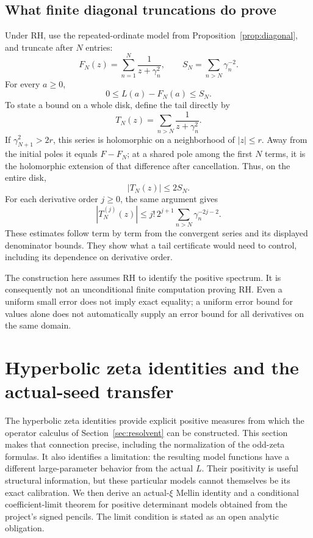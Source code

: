 \documentclass[11pt,a4paper]{article}
\numberwithin{equation}{section}
\theoremstyle{definition}
\theoremstyle{remark}
\begin{document}
\subsection{What finite diagonal truncations do prove}

Under RH, use the repeated-ordinate model from
Proposition~\ref{prop:diagonal}, and truncate after $N$ entries:
\[
F_N(z)=\sum_{n=1}^N\frac1{z+\gamma_n^2},\qquad
S_N=\sum_{n>N}\gamma_n^{-2}.
\]
For every $a\geq0$,
\begin{equation}\label{eq:positive-tail}
0\leq L(a)-F_N(a)\leq S_N.
\end{equation}
To state a bound on a whole disk, define the tail directly by
\[
T_N(z)=\sum_{n>N}\frac1{z+\gamma_n^2}.
\]
If $\gamma_{N+1}^2>2r$, this series is holomorphic on a neighborhood
of $|z|\leq r$. Away from the initial poles it equals $F-F_N$;
at a shared pole among the first $N$ terms, it is the holomorphic
extension of that difference after cancellation. Thus, on the entire disk,
\begin{equation}\label{eq:complex-tail}
|T_N(z)|\leq2S_N.
\end{equation}
For each derivative order $j\geq0$, the same argument gives
\begin{equation}\label{eq:derivative-tail}
|T_N^{(j)}(z)|
\leq j!\,2^{j+1}\sum_{n>N}\gamma_n^{-2j-2}.
\end{equation}
These estimates follow term by term from the convergent series and
its displayed denominator bounds. They show what a tail certificate
would need to control, including its dependence on derivative order.

The construction here assumes RH to identify the positive spectrum.
It is consequently not an unconditional finite computation proving RH.
Even a uniform small error does not imply exact equality; a uniform
error bound for values alone does not automatically supply an error
bound for all derivatives on the same domain.

\section[Hyperbolic zeta connections]{Hyperbolic zeta identities and the actual-seed transfer}\label{sec:hyperbolic}

The hyperbolic zeta identities provide explicit positive measures from
which the operator calculus of Section~\ref{sec:resolvent} can be
constructed. This section makes that connection precise, including the
normalization of the odd-zeta formulas. It also identifies a limitation:
the resulting model functions have a different large-parameter behavior
from the actual $L$. Their positivity is useful structural information,
but these particular models cannot themselves be its exact calibration.
We then derive an actual-$\xi$ Mellin identity and a conditional
coefficient-limit theorem for positive determinant models obtained
from the project's signed pencils. The limit condition is stated as
an open analytic obligation.
\end{document}

